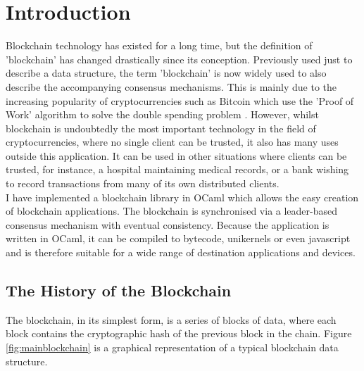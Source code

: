 \documentclass[12pt,a4paper,twoside,openright]{report}
\begin{document}
	\chapter{Introduction}
	Blockchain technology has existed for a long time, but the definition of 'blockchain' has changed drastically since its conception.
	Previously used just to describe a data structure, the term 'blockchain' is now widely used to also describe the accompanying consensus mechanisms.
	This is mainly due to the increasing popularity of cryptocurrencies such as Bitcoin \cite{Bitcoin} which use the 'Proof of Work' algorithm to solve the double spending problem \cite{}.
	However, whilst blockchain is undoubtedly the most important technology in the field of cryptocurrencies, where no single client can be trusted, it also has many uses outside this application.
	It can be used in other situations where clients can be trusted, for instance, a hospital maintaining medical records, or a bank wishing to record transactions from many of its own distributed clients.\\
	

	I have implemented a blockchain library in OCaml which allows the easy creation of blockchain applications.
	The blockchain is synchronised via a leader-based consensus mechanism with eventual consistency.
	Because the application is written in OCaml, it can be compiled to bytecode, unikernels or even javascript and is therefore suitable for a wide range of destination applications and devices.

	\section{The History of the Blockchain}
	The blockchain, in its simplest form, is a series of blocks of data, where each block contains the cryptographic hash of the previous block in the chain. 
	Figure \ref{fig:mainblockchain} is a graphical representation of a typical blockchain data structure.\\
\end{document}
